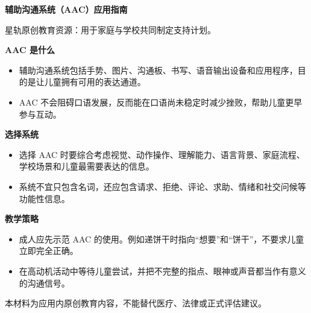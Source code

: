 \documentclass[11pt]{article}
\begin{document}
{\color[HTML]{1F5FD2}\LARGE\bfseries 辅助沟通系统（AAC）应用指南\par}
{\color[HTML]{667085}\small 星轨原创教育资源：用于家庭与学校共同制定支持计划。\par}
\vspace{0.8em}
{\color[HTML]{111827}\large\bfseries AAC 是什么\par}
\begin{itemize}
\item 辅助沟通系统包括手势、图片、沟通板、书写、语音输出设备和应用程序，目的是让儿童拥有可用的表达通道。
\item AAC 不会阻碍口语发展，反而能在口语尚未稳定时减少挫败，帮助儿童更早参与互动。
\end{itemize}
{\color[HTML]{111827}\large\bfseries 选择系统\par}
\begin{itemize}
\item 选择 AAC 时要综合考虑视觉、动作操作、理解能力、语言背景、家庭流程、学校场景和儿童最需要表达的信息。
\item 系统不宜只包含名词，还应包含请求、拒绝、评论、求助、情绪和社交问候等功能性信息。
\end{itemize}
{\color[HTML]{111827}\large\bfseries 教学策略\par}
\begin{itemize}
\item 成人应先示范 AAC 的使用。例如递饼干时指向“想要”和“饼干”，不要求儿童立即完全正确。
\item 在高动机活动中等待儿童尝试，并把不完整的指点、眼神或声音都当作有意义的沟通信号。
\end{itemize}
\vfill
{\color[HTML]{667085}\footnotesize 本材料为应用内原创教育内容，不能替代医疗、法律或正式评估建议。\par}
\end{document}
